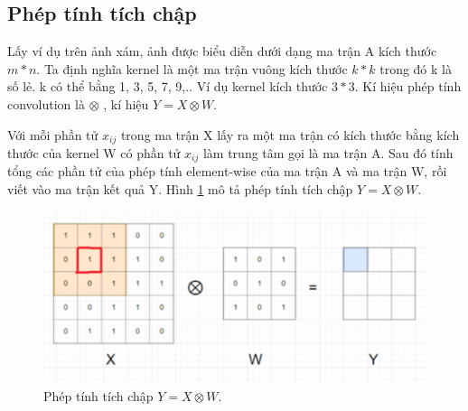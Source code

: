 \subsection{Phép tính tích chập}
Lấy ví dụ trên ảnh xám, ảnh được biểu diễn dưới dạng ma trận A kích thước $m*n$. Ta định nghĩa kernel là một ma trận vuông kích thước $k*k$ trong đó k là số lẻ. k có thể bằng 1, 3, 5, 7, 9,.. Ví dụ kernel kích thước $3*3$. Kí hiệu phép tính convolution là $\otimes$ , kí hiệu $Y = X \otimes W $.\par
Với mỗi phần tử $x_{ij}$ trong ma trận X lấy ra một ma trận có kích thước bằng kích thước của kernel W có phần tử $x_{ij}$ làm trung tâm gọi là ma trận A. Sau đó tính tổng các phần tử của phép tính element-wise của ma trận A và ma trận W, rồi viết vào ma trận kết quả Y. Hình \ref{fig:neural3} mô tả phép tính tích chập $Y = X \otimes W $.\par
\begin{figure}[ht!]
\centerline{\includegraphics[scale=0.6]{images/neural3.png}}
\caption{Phép tính tích chập $Y = X \otimes W $.}
\label{fig:neural3}
\end{figure}
